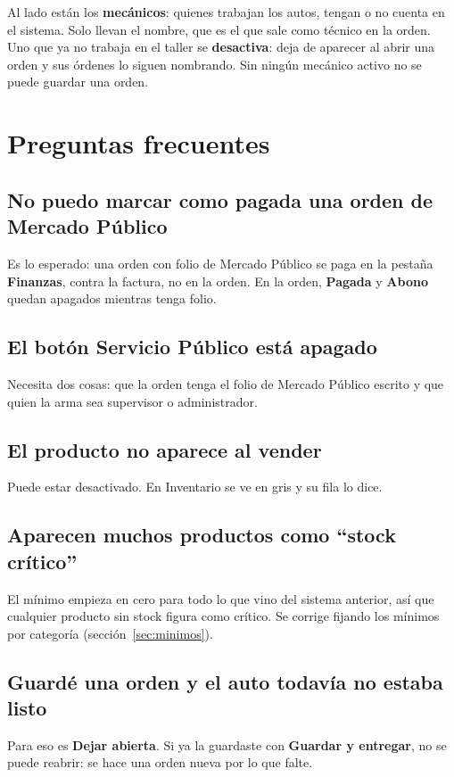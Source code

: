 \documentclass[11pt,a4paper]{article}
\begin{document}
Al lado están los \textbf{mecánicos}: quienes trabajan los autos, tengan o no
cuenta en el sistema. Solo llevan el nombre, que es el que sale como técnico en
la orden. Uno que ya no trabaja en el taller se \textbf{desactiva}: deja de
aparecer al abrir una orden y sus órdenes lo siguen nombrando. Sin ningún
mecánico activo no se puede guardar una orden.

\section{Preguntas frecuentes}

\subsection*{No puedo marcar como pagada una orden de Mercado Público}
Es lo esperado: una orden con folio de Mercado Público se paga en la pestaña
\textbf{Finanzas}, contra la factura, no en la orden. En la orden, \textbf{Pagada}
y \textbf{Abono} quedan apagados mientras tenga folio.

\subsection*{El botón Servicio Público está apagado}
Necesita dos cosas: que la orden tenga el folio de Mercado Público escrito y que
quien la arma sea supervisor o administrador.

\subsection*{El producto no aparece al vender}
Puede estar desactivado. En Inventario se ve en gris y su fila lo dice.

\subsection*{Aparecen muchos productos como ``stock crítico''}
El mínimo empieza en cero para todo lo que vino del sistema anterior, así que
cualquier producto sin stock figura como crítico. Se corrige fijando los mínimos
por categoría (sección~\ref{sec:minimos}).

\subsection*{Guardé una orden y el auto todavía no estaba listo}

Para eso es \textbf{Dejar abierta}. Si ya la guardaste con \textbf{Guardar y
entregar}, no se puede reabrir: se hace una orden nueva por lo que falte.
\end{document}
